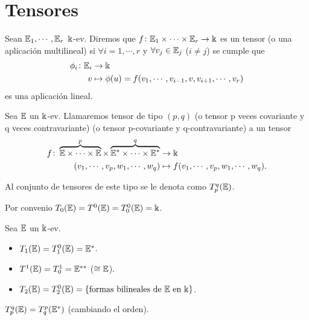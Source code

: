 \section{Tensores}

\begin{defi}[Tensor]
    Sean $\mathbb{E}_1,\cdots , \mathbb{E}_r$ $\Bbbk$-ev. Diremos que
    $f \colon \mathbb{E}_1 \times \cdots \times \mathbb{E}_r \to \Bbbk$ es un tensor (o una aplicación
    multilineal) si $\forall i=1,\cdots , r$ y $\forall v_j \in \mathbb{E}_j$ ($i \neq j$)
    se cumple que
    \[
         \begin{aligned}
             \phi_i \colon \mathbb{E}_i &\to \Bbbk \\
             v &\mapsto \phi(u)=f(v_1,\cdots , v_{i-1}, v, v_{i+1}, \cdots , v_r)
         \end{aligned}
    \]
    es una aplicación lineal.
\end{defi}
\begin{defi}
    Sea $\mathbb{E}$ un $\Bbbk$-ev. Llamaremos tensor de tipo $(p,q)$ (o tensor p veces
    covariante y q veces contravariante) (o tensor p-covariante y q-contravariante)
    a un tensor
    \[
        \begin{aligned}
            f \colon \overbrace{\mathbb{E} \times \cdots \times \mathbb{E}}^p\times
            \overbrace{\mathbb{E}^* \times \cdots \times \mathbb{E}^*}^q&\to \Bbbk \\
            (v_1, \cdots, v_p, w_1, \cdots, w_q) &\mapsto
            f(v_1,\cdots,v_p,w_1,\cdots,w_q).
        \end{aligned}
    \]
\end{defi}
\begin{obs}
    Al conjunto de tensores  de este tipo se le denota como $T_p^q(\mathbb{E})$.
\end{obs}
\begin{obs}
    Por convenio $T_0(\mathbb{E}) = T^0(\mathbb{E}) = T_0^0(\mathbb{E}) = \Bbbk$.
\end{obs}
\begin{example}
    Sea $\mathbb{E}$ un $\Bbbk$-ev.
    \begin{itemize}
        \item $T_1(\mathbb{E}) = T_1^0(\mathbb{E}) = \mathbb{E}^*$.
        \item $T^1(\mathbb{E}) = T_0^1 = \mathbb{E}^{**}$ ($\cong \mathbb{E}$).
        \item $T_2(\mathbb{E}) = T_2^0(\mathbb{E}) = \{\text{formas bilineales de } \mathbb{E} \text{ en } \Bbbk\}$.
    \end{itemize}
\end{example}
\begin{prop}
    $T_p^q(\mathbb{E}) = T_q^p(\mathbb{E}^*)$ (cambiando el orden).
\end{prop}

